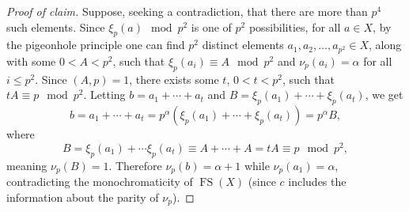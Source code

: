 \documentclass[10pt,a4paper]{amsart}
\DeclareMathOperator{\fs}{FS}
\begin{document}
\begin{proof}[Proof of claim]
Suppose, seeking a contradiction, that there are more than $p^4$ such elements. Since $\xi_p(a)\mod p^2$ is one of $p^2$ possibilities, for all $a\in X$, by the pigeonhole principle one can find $p^2$ distinct elements $a_1,a_2,\ldots,a_{p^2}\in X$, along with some $0<A<p^2$, such that $\xi_p(a_i)\equiv A\mod p^2$ and $\nu_p(a_i)=\alpha$ for all $i\leq p^2$. Since $(A,p)=1$, there exists some $t$, $0<t<p^2$, such that $tA\equiv p\mod p^2$. Letting $b=a_1+\cdots+a_t$ and $B=\xi_p(a_1)+\cdots+\xi_p(a_t)$, we get
\begin{equation*}
b=a_1+\cdots+a_t=p^\alpha(\xi_p(a_1)+\cdots+\xi_p(a_t))=p^\alpha B,
\end{equation*}
where
\begin{equation*}
B=\xi_p(a_1)+\cdots\xi_p(a_t)\equiv A+\cdots+A=tA\equiv p\mod p^2,
\end{equation*}
meaning $\nu_p(B)=1$. Therefore $\nu_p(b)=\alpha+1$ while $\nu_p(a_1)=\alpha$, contradicting the monochromaticity of $\fs(X)$ (since $c$ includes the information about the parity of $\nu_p$).
\end{proof}
\end{document}
